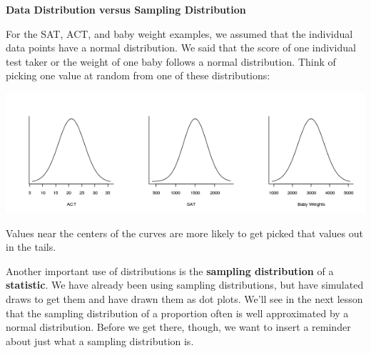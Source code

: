\def\theTopic{Reading 18}

\begin{center}
{\bf {\large Data Distribution versus Sampling Distribution }}
\end{center}


For the SAT,  ACT, and baby weight examples, we assumed that the
individual data points have a normal distribution.   We said that the
score of one individual test taker or the weight of one baby follows a
normal distribution.  Think of picking one value at random from one of
these distributions:




\includegraphics[width=\linewidth]{plots/3normals.png}

Values near the centers of the curves are more likely to get picked
that values out in the tails. 



Another important use of distributions is the {\bf sampling
  distribution} of a {\bf statistic}.  We have already been using sampling
distributions, but have simulated draws to get them and have drawn
them as dot plots.  We'll see in the next lesson that the sampling
distribution of a proportion often is well approximated by a normal
distribution. Before we get there, though, we want to insert a
reminder about just what a sampling distribution is.

